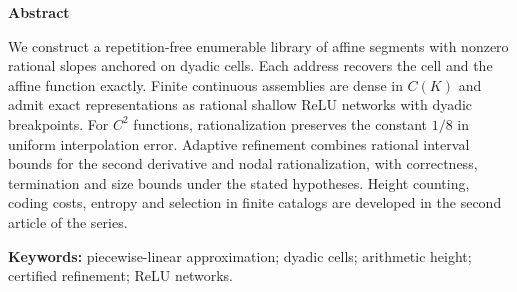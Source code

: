 \renewcommand{\eqn}[2]{\begin{equation}\label{artigo_1:eq:#1}#2\end{equation}}



\begin{abstract}
Este trabalho constrói uma biblioteca enumerável, sem repetições, de segmentos afins de inclinação racional não nula ancorados em células diádicas, na qual cada endereço recupera exatamente a célula e a função afim correspondentes. Demonstra-se que as montagens contínuas finitas são densas em $C(K)$ e admitem representação exata por redes ReLU rasas racionais com quebras diádicas. Para funções $C^2$, mostra-se que a racionalização preserva a constante $1/8$ do erro interpolatório uniforme. O refinamento adaptativo combina majorantes intervalares racionais da segunda derivada com a racionalização nodal, e a sua correção, o seu término e o seu tamanho são controlados sob as hipóteses explicitadas. A contagem por altura, os custos de codificação, a entropia e a seleção em catálogos finitos são desenvolvidos no segundo artigo da série.

\smallskip\noindent\textbf{Palavras-chave:} aproximação linear por partes; células diádicas; altura aritmética; refinamento certificado; redes ReLU.
\end{abstract}

\begingroup\small
\begin{center}\textbf{Abstract}\end{center}
\noindent We construct a repetition-free enumerable library of affine segments with nonzero rational slopes anchored on dyadic cells. Each address recovers the cell and the affine function exactly. Finite continuous assemblies are dense in $C(K)$ and admit exact representations as rational shallow ReLU networks with dyadic breakpoints. For $C^2$ functions, rationalization preserves the constant $1/8$ in uniform interpolation error. Adaptive refinement combines rational interval bounds for the second derivative and nodal rationalization, with correctness, termination and size bounds under the stated hypotheses. Height counting, coding costs, entropy and selection in finite catalogs are developed in the second article of the series.

\smallskip\noindent\textbf{Keywords:} piecewise-linear approximation; dyadic cells; arithmetic height; certified refinement; ReLU networks.
\endgroup
